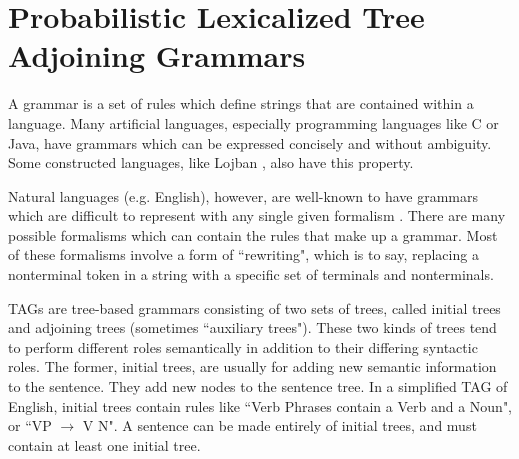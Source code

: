 \section{Probabilistic Lexicalized Tree Adjoining Grammars}

A grammar is a set of rules which define strings that are contained within a language.
Many artificial languages, especially programming languages like C or Java, have
grammars which can be expressed concisely and without ambiguity.  Some
constructed languages, like Lojban \cite{lojban}, also have this property.

Natural languages (e.g. English), however, are well-known to have grammars which are difficult
to represent with any single given formalism \cite{klein2012context}. There are many possible
formalisms which can contain the rules that make up
a grammar.  Most of these formalisms involve a form of ``rewriting", which
is to say, replacing a nonterminal token in a string with a specific set of
terminals and nonterminals.

TAGs are tree-based grammars consisting of two sets of trees, called initial
trees and adjoining trees (sometimes ``auxiliary trees").  These two kinds of trees tend to perform
different roles semantically in addition to their differing syntactic roles.  The former,
initial trees, are usually for adding new semantic information to the sentence.  They
add new nodes to the sentence tree.  In a simplified TAG of English,
initial trees contain rules like ``Verb Phrases contain a Verb and a Noun", or ``VP $\rightarrow$ V N".
A sentence can be made entirely of initial trees, and must contain at least
one initial tree.

